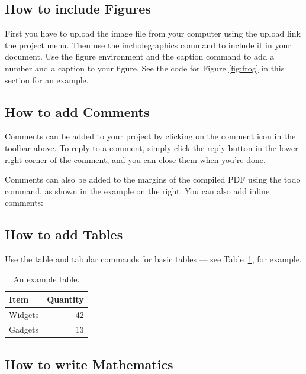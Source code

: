 \subsection{How to include Figures}

First you have to upload the image file from your computer using the upload link the project menu. Then use the includegraphics command to include it in your document. Use the figure environment and the caption command to add a number and a caption to your figure. See the code for Figure \ref{fig:frog} in this section for an example.

\subsection{How to add Comments}

Comments can be added to your project by clicking on the comment icon in the toolbar above. %
%
%
To reply to a comment, simply click the reply button in the lower right corner of the comment, and you can close them when you're done.

Comments can also be added to the margins of the compiled PDF using the todo command, as shown in the example on the right. You can also add inline comments:


\subsection{How to add Tables}

Use the table and tabular commands for basic tables --- see Table~\ref{tab:widgets}, for example. 

\begin{table}
\centering
\begin{tabular}{l|r}
Item & Quantity \\\hline
Widgets & 42 \\
Gadgets & 13
\end{tabular}
\caption{\label{tab:widgets}An example table.}
\end{table}

\subsection{How to write Mathematics}

